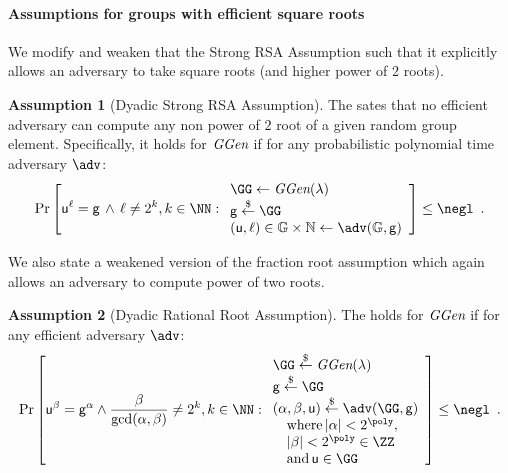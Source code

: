 \documentclass{article}
\theoremstyle{definition}
\newtheorem{assumption}{Assumption}
\begin{document}
\paragraph{Assumptions for groups with efficient square roots}
We modify and weaken that the Strong RSA Assumption such that it explicitly allows an adversary to take square roots (and higher power of $2$ roots).
\begin{assumption}[Dyadic Strong RSA Assumption]
\label{assum:dyadicstrongRSA}
The  sates that no efficient adversary can compute any non power of $2$ root of a given random group element. Specifically, it holds for $\textit{GGen}$ if for any probabilistic polynomial time adversary $\adv$:
\[
    \Pr\left[\gr{u}^\ell = \gr{g} \, \wedge \, \ell\neq 2^k, k \in \NN:
    \begin{array}{l}
         \GG \leftarrow \ggen(\lambda)  \\
         \gr{g} \sample \GG \\
         (\gr{u}, \ell) \in \mathbb{G} \times \mathbb{N} \leftarrow \adv(\mathbb{G}, \gr{g}) \\
    \end{array}\right] \leq \negl \enspace .
\]
\end{assumption} 

We also state a weakened version of the fraction root assumption which again allows an adversary to compute power of two roots.
\begin{assumption}[Dyadic Rational Root Assumption]
\label{assum:dyadicfracroot}
The  holds for $\textit{GGen}$ if for any efficient adversary $\adv$:
\[        
                \Pr\left[\gr{u}^\beta = \gr{g}^{\alpha} \wedge \frac{\beta}{\gcd(\alpha,\beta)}\neq 2^k,  k \in \NN   : 
                \begin{array}{l} 
                      \GG \sample \ggen(\lambda) \\ 
                      \gr{g} \sample \GG \\
                      (\alpha, \beta, \gr{u}) \sample \adv(\GG, \gr{g}) \\
                      \quad \textnormal{where} \, |\alpha|<2^{\poly}, \\
                      \quad |\beta|<2^{\poly} \in \ZZ \\
                      \quad \textnormal{and} \, \gr{u} \in \GG 
                \end{array} 
        \right] \leq \negl \enspace .
\]
\end{assumption}
\end{document}
